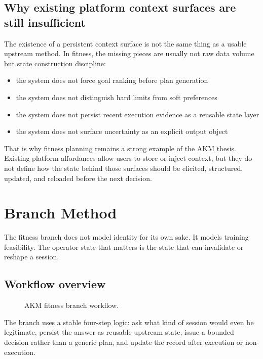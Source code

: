 \documentclass[11pt]{article}
\begin{document}
\subsection{Why existing platform context surfaces are still insufficient}
The existence of a persistent context surface is not the same thing as a usable upstream method. In fitness, the missing pieces are usually not raw data volume but state construction discipline:
\begin{itemize}[leftmargin=1.5em]
\item the system does not force goal ranking before plan generation
\item the system does not distinguish hard limits from soft preferences
\item the system does not persist recent execution evidence as a reusable state layer
\item the system does not surface uncertainty as an explicit output object
\end{itemize}
That is why fitness planning remains a strong example of the AKM thesis. Existing platform affordances allow users to store or inject context, but they do not define how the state behind those surfaces should be elicited, structured, updated, and reloaded before the next decision.
\section{Branch Method}
The fitness branch does not model identity for its own sake. It models training feasibility. The operator state that matters is the state that can invalidate or reshape a session.
\subsection{Workflow overview}
\begin{figure}[htbp]
\centering
{}
\caption{AKM fitness branch workflow.}
\end{figure}
The branch uses a stable four-step logic: ask what kind of session would even be legitimate, persist the answer as reusable upstream state, issue a bounded decision rather than a generic plan, and update the record after execution or non-execution.
\end{document}
